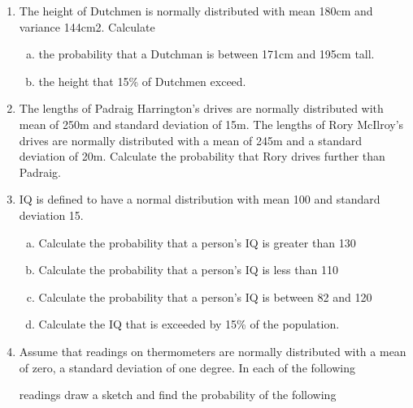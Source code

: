 \documentclass[a4paper,12pt]{article}
\begin{document}
\begin{enumerate}
\item The height of Dutchmen is normally distributed with mean 180cm and variance 144cm2. Calculate

\begin{enumerate}[(a)]

\item the probability that a Dutchman is between 171cm and 195cm tall.

\item the height that 15\% of Dutchmen exceed.

\end{enumerate}






\item The lengths of Padraig Harrington's drives are normally distributed with mean of 250m and standard deviation of 15m. The lengths of Rory McIlroy's drives are normally distributed with a mean of 245m and a standard deviation of 20m. Calculate the probability that Rory drives further than Padraig.



\item IQ  is defined to have a normal distribution with mean 100 and standard deviation 15. 



\begin{enumerate}[(a)]

\item Calculate the probability that a person’s IQ is greater than 130

\item Calculate the probability that a person’s IQ is less than 110

\item Calculate the probability that a person’s IQ is between 82 and 120

\item Calculate the IQ that is exceeded by 15\% of the population.

\end{enumerate}





\item Assume that readings on thermometers are normally distributed with a mean of zero, a standard deviation of one degree.  In each of the following

readings draw a sketch and find the probability of the following


\end{enumerate}
\end{document}
